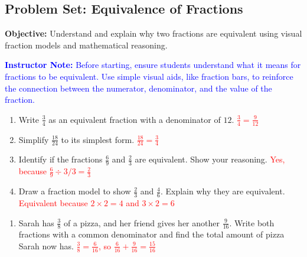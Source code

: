 \documentclass[12pt]{article}
\title{}
\date{}
\begin{document}
\subsection*{Problem Set: Equivalence of Fractions}
\onehalfspacing

\begin{tcolorbox}[colframe=black!40, colback=gray!5, 
coltitle=black, colbacktitle=black!20, fonttitle=\bfseries\Large, 
title=Learning Objective, halign title=center, left=5pt, right=5pt, top=5pt, bottom=15pt]
\textbf{Objective:} Understand and explain why two fractions are equivalent using visual fraction models and mathematical reasoning.

\textcolor{blue}{\textbf{Instructor Note:} Before starting, ensure students understand what it means for fractions to be equivalent. Use simple visual aids, like fraction bars, to reinforce the connection between the numerator, denominator, and the value of the fraction.}
\end{tcolorbox}

\begin{tcolorbox}[colframe=black!60, colback=white, 
coltitle=black, colbacktitle=black!15, fonttitle=\bfseries\Large, 
title=Exercises, halign title=center, left=10pt, right=10pt, top=10pt, bottom=60pt]
\begin{enumerate}[itemsep=3em]
    \item Write \( \frac{3}{4} \) as an equivalent fraction with a denominator of \( 12 \). \textcolor{red}{\( \frac{3}{4} = \frac{9}{12} \)}
    \item Simplify \( \frac{18}{24} \) to its simplest form. \textcolor{red}{\( \frac{18}{24} = \frac{3}{4} \)}
    \item Identify if the fractions \( \frac{6}{9} \) and \( \frac{2}{3} \) are equivalent. Show your reasoning. \textcolor{red}{Yes, because \( \frac{6}{9} \div 3/3 = \frac{2}{3} \)}
    \item Draw a fraction model to show \( \frac{2}{3} \) and \( \frac{4}{6} \). Explain why they are equivalent. \textcolor{red}{Equivalent because \( 2 \times 2 = 4 \) and \( 3 \times 2 = 6 \)}
\end{enumerate}
\end{tcolorbox}

\vspace{1em}

\begin{tcolorbox}[colframe=black!60, colback=white, 
coltitle=black, colbacktitle=black!15, fonttitle=\bfseries\Large, 
title=Problems, halign title=center, left=10pt, right=10pt, top=10pt, bottom=90pt]
\begin{enumerate}[start=9, itemsep=5em]
    \item Sarah has \( \frac{3}{8} \) of a pizza, and her friend gives her another \( \frac{9}{16} \). Write both fractions with a common denominator and find the total amount of pizza Sarah now has. \textcolor{red}{\( \frac{3}{8} = \frac{6}{16} \), so \( \frac{6}{16} + \frac{9}{16} = \frac{15}{16} \)}
\end{enumerate}
\end{tcolorbox}
\end{document}
